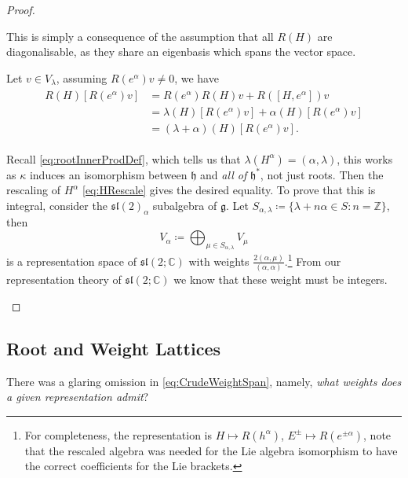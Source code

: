 \documentclass[11pt,fleqn]{article}
\begin{document}
\begin{proof}\hfill
	\begin{ronumerate}
		\item This is simply a consequence of the assumption that all $R(H)$ are diagonalisable, as they share an eigenbasis which spans the vector space.
		\item Let $v \in V_\lambda$, assuming $R(e^\alpha)v \neq 0$, we have
			\begin{align}
				\begin{split}
					R(H) \left[ R(e^\alpha) v \right] 
					&= R(e^\alpha) R(H) v + R\left( \left[ H, e^\alpha \right] \right) v\\
					&= \lambda(H) \left[R(e^\alpha) v \right]  + \alpha(H) \left[R(e^\alpha) v \right] \\
					&= (\lambda + \alpha)(H) \left[R(e^\alpha) v \right].
				\end{split}
			\end{align}
		\item Recall \eqref{eq:rootInnerProdDef}, which tells us that $\lambda(H^\alpha) = (\alpha,\lambda)$, this works as $\kappa$ induces an isomorphism between $\mathfrak{h}$ and \textit{all of} $\mathfrak{h}^*$, not just roots. Then the rescaling of $H^\alpha$ \eqref{eq:HRescale} gives the desired equality. To prove that this is integral, consider the $\mathfrak{sl}(2)_\alpha$ subalgebra of $\mathfrak{g}$. Let $S_{\alpha, \lambda} \coloneqq \{ \lambda  + n \alpha \in S : n = \mathbb{Z} \} $, then 
			\begin{equation}
				V_\alpha \coloneqq \bigoplus_{\mu \in S_{\alpha, \lambda}} V_\mu
			\end{equation}
		is a representation space of $\mathfrak{sl}(2; \mathbb{C})$ with weights $\frac{2 (\alpha, \mu)}{(\alpha, \alpha)}$.\footnote{For completeness, the representation is $H \mapsto R(h^\alpha)$, $E^\pm \mapsto R(e^{\pm \alpha})$, note that the rescaled algebra was needed for the Lie algebra isomorphism to have the correct coefficients for the Lie brackets.} From our representation theory of $\mathfrak{sl}(2;\mathbb{C})$ we know that these weight must be integers.
	\end{ronumerate}
\end{proof}

\subsection{Root and Weight Lattices}

\begin{remark}
	There was a glaring omission in \eqref{eq:CrudeWeightSpan}, namely, \textit{what weights does a given representation admit}?
\end{remark}
\end{document}
